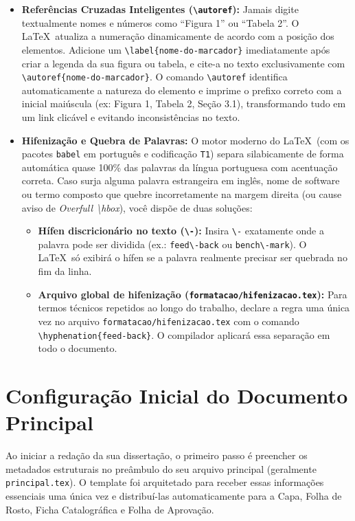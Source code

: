 \documentclass[a4paper,12pt]{article}
\begin{document}
\begin{itemize}
    \item \textbf{Referências Cruzadas Inteligentes (\texttt{\textbackslash autoref}):} Jamais digite textualmente nomes e números como ``Figura 1'' ou ``Tabela 2''. O \LaTeX \ atualiza a numeração dinamicamente de acordo com a posição dos elementos. Adicione um \texttt{\textbackslash label\{nome-do-marcador\}} imediatamente após criar a legenda da sua figura ou tabela, e cite-a no texto exclusivamente com \texttt{\textbackslash autoref\{nome-do-marcador\}}. O comando \texttt{\textbackslash autoref} identifica automaticamente a natureza do elemento e imprime o prefixo correto com a inicial maiúscula (ex: Figura 1, Tabela 2, Seção 3.1), transformando tudo em um link clicável e evitando inconsistências no texto.
    \item \textbf{Hifenização e Quebra de Palavras:} O motor moderno do \LaTeX \ (com os pacotes \texttt{babel} em português e codificação \texttt{T1}) separa silabicamente de forma automática quase 100\% das palavras da língua portuguesa com acentuação correta. Caso surja alguma palavra estrangeira em inglês, nome de software ou termo composto que quebre incorretamente na margem direita (ou cause aviso de \textit{Overfull \textbackslash hbox}), você dispõe de duas soluções:
    \begin{itemize}
        \item \textbf{Hífen discricionário no texto (\texttt{\textbackslash-}):} Insira \texttt{\textbackslash-} exatamente onde a palavra pode ser dividida (ex.: \texttt{feed\textbackslash-back} ou \texttt{bench\textbackslash-mark}). O \LaTeX \ só exibirá o hífen se a palavra realmente precisar ser quebrada no fim da linha.
        \item \textbf{Arquivo global de hifenização (\texttt{formatacao/hifenizacao.tex}):} Para termos técnicos repetidos ao longo do trabalho, declare a regra uma única vez no arquivo \texttt{formatacao/hifenizacao.tex} com o comando \texttt{\textbackslash hyphenation\{feed-back\}}. O compilador aplicará essa separação em todo o documento.
    \end{itemize}
\end{itemize}

\section{Configuração Inicial do Documento Principal}

Ao iniciar a redação da sua dissertação, o primeiro passo é preencher os metadados estruturais no preâmbulo do seu arquivo principal (geralmente \texttt{principal.tex}). O template foi arquitetado para receber essas informações essenciais uma única vez e distribuí-las automaticamente para a Capa, Folha de Rosto, Ficha Catalográfica e Folha de Aprovação.
\end{document}
